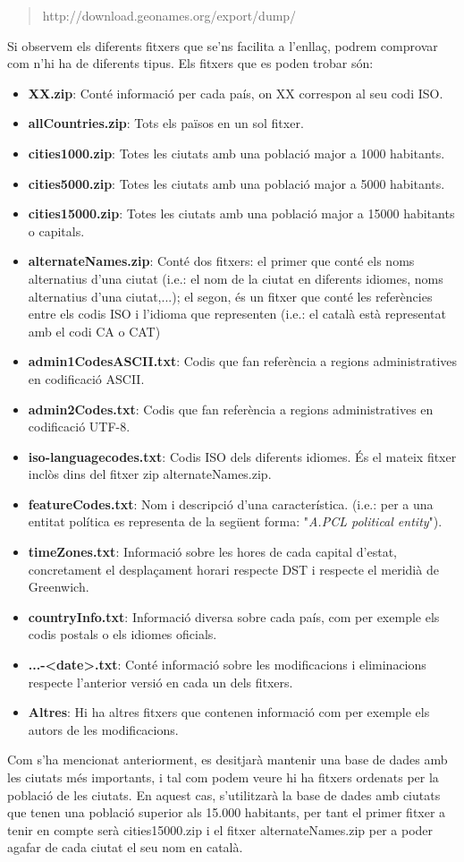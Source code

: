\documentclass[12pt,a4paper,openright,oneside]{article}
\numberwithin{equation}{section}
\theoremstyle{definition}
\begin{document}
\begin{quote}
http://download.geonames.org/export/dump/
\end{quote}
Si observem els diferents fitxers que se'ns facilita a l'enllaç, podrem comprovar com n'hi ha de diferents tipus. Els fitxers que es poden trobar són:
\begin{itemize}
\item \textbf{XX.zip}: Conté informació per cada país, on XX correspon al seu codi ISO.
\item \textbf{allCountries.zip}: Tots els països en un sol fitxer.
\item \textbf{cities1000.zip}: Totes les ciutats amb una població major a 1000 habitants.
\item \textbf{cities5000.zip}: Totes les ciutats amb una població major a 5000 habitants.
\item \textbf{cities15000.zip}: Totes les ciutats amb una població major a 15000 habitants o capitals.
\item \textbf{alternateNames.zip}: Conté dos fitxers: el primer que conté els noms alternatius d'una ciutat (i.e.: el nom de la ciutat en diferents idiomes, noms alternatius d'una ciutat,...); el segon, és un fitxer que conté les referències entre els codis ISO i l'idioma que representen (i.e.: el català està representat amb el codi CA o CAT)
\item \textbf{admin1CodesASCII.txt}: Codis que fan referència a regions administratives en codificació ASCII.
\item \textbf{admin2Codes.txt}: Codis que fan referència a regions administratives en codificació UTF-8.
\item \textbf{iso-languagecodes.txt}: Codis ISO dels diferents idiomes. És el mateix fitxer inclòs dins del fitxer zip alternateNames.zip.
\item \textbf{featureCodes.txt}: Nom i descripció d'una característica. (i.e.: per a una entitat política es representa de la següent forma: "\emph{A.PCL	political entity}").
\item \textbf{timeZones.txt}: Informació sobre les hores de cada capital d'estat, concretament el desplaçament horari respecte DST i respecte el meridià de Greenwich.
\item \textbf{countryInfo.txt}: Informació diversa sobre cada país, com per exemple els codis postals o els idiomes oficials.
\item \textbf{...-<date>.txt}: Conté informació sobre les modificacions i eliminacions respecte l'anterior versió en cada un dels fitxers.
\item \textbf{Altres}: Hi ha altres fitxers que contenen informació com per exemple els autors de les modificacions.
\end{itemize}
Com s'ha mencionat anteriorment, es desitjarà mantenir una base de dades amb les ciutats més importants, i tal com podem veure hi ha fitxers ordenats per la població de les ciutats. En aquest cas, s'utilitzarà la base de dades amb ciutats que tenen una població superior als 15.000 habitants, per tant el primer fitxer a tenir en compte serà cities15000.zip i el fitxer alternateNames.zip per a poder agafar de cada ciutat el seu nom en català.\\
\end{document}
